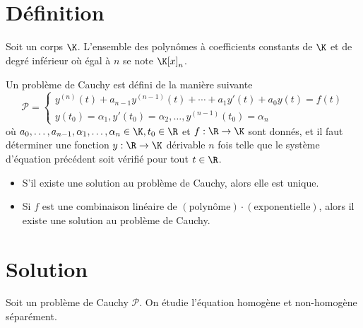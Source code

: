 \section{Définition}

\begin{mynota}
	Soit un corps $\K$.
	L'ensemble des polynômes à coefficients constants de $\K$ et de degré inférieur où égal à $n$ se note $\K[x]_n$.
\end{mynota}

\begin{mydef}
	Un problème de Cauchy est défini de la manière suivante
	\[ \mathcal{P} = \left\{
	\begin{array}{l}
		y^{(n)}(t) + a_{n-1}y^{(n-1)}(t) + \cdots + a_1 y'(t) + a_0 y(t) = f(t) \\
		y(t_0) = \alpha_1, y'(t_0) = \alpha_2, \dots , y^{(n-1)}(t_0) = \alpha_n
	\end{array} \right.
	\]
	où $a_0, \dots, a_{n-1}, \alpha_1, \dots, \alpha_n \in \K, t_0 \in \R$ et $f: \R \to \K$ sont donnés,
	et il faut déterminer une fonction $y: \R \to \K$ dérivable $n$ fois
	telle que le système d'équation précédent soit vérifié pour tout $t \in \R$.
\end{mydef}

\begin{mytheo}\InsertTheoremBreak
	\begin{itemize}
		\item S'il existe une solution au problème de Cauchy, alors elle est unique.
		\item Si $f$ est une combinaison linéaire de $(\mathrm{polynôme})\cdot(\mathrm{exponentielle})$,
			alors il existe une solution au problème de Cauchy.
	\end{itemize}
\end{mytheo}

\section{Solution}

Soit un problème de Cauchy $\mathcal{P}$. On étudie l'équation homogène et non-homogène séparément.

